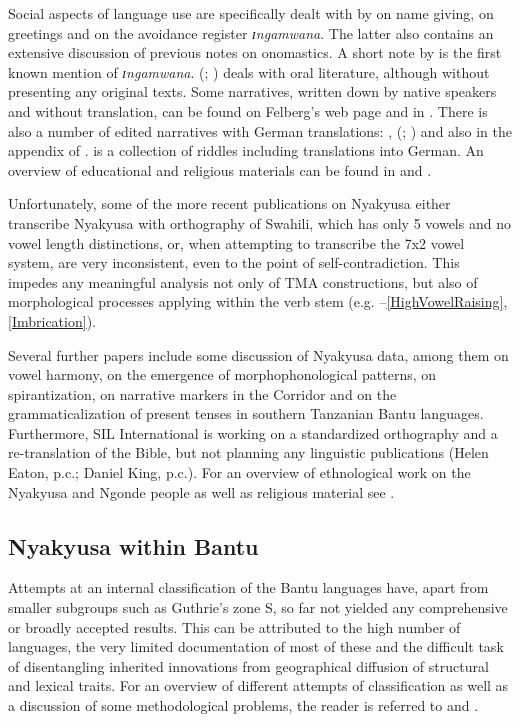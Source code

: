 Social aspects of language use are specifically dealt with by \citet{HodsonT1934} on name giving, \citet{WalshM1982} on greetings and \citet{KolbusaS2000} on the avoidance register \textit{ɪngamwana}. The latter also contains an extensive discussion of previous notes on onomastics. A short note by \citet{Cleve1904} is the first known mention of \textit{ɪngamwana}.
\citeauthor{MwakasakaC1975} (\citeyear{MwakasakaC1975}; \citeyear{MwakasakaC1978}) deals with oral literature, although without presenting any original texts. Some narratives, written down by native speakers and without translation, can be found on Felberg's web page \citep{FelbergK2010} and in \citet{MwangokaNVoorhoeveJ1960a}. There is also a number of edited narratives with German translations: \citet{BergerP1933}, \citeauthor{BusseJ1942} (\citeyear{BusseJ1942}; \citeyear{BusseJ1949}) and also in the appendix of \citet{SchumannK1899}. \citet{BusseJ1957} is a collection of riddles including translations into German. An overview of educational and religious materials can be found in \citet{KroegerR2011} and \citet{FelbergK2010}.

Unfortunately, some of the more recent publications on Nyakyusa either transcribe Nyakyusa with orthography of Swahili, which has only 5 vowels and no vowel length distinctions, or, when attempting to transcribe the 7x2 vowel system, are very inconsistent, even to the point of self-contradiction. This impedes any meaningful analysis not only of TMA constructions, but also of morphological processes applying within the verb stem (e.g. --\ref{HighVowelRaising}, \ref{Imbrication}).

Several further papers include some discussion of Nyakyusa data, among them \citet{HymanL1999} on vowel harmony, \citet{HymanL2003b} on the emergence of morphophonological patterns, \citet{BoestonK2008} on spirantization, \citet{EatonH2013} on narrative markers in the Corridor and \citet{PersohnBBernanderR2016} on the grammaticalization of present tenses in southern Tanzanian Bantu languages. Furthermore, SIL International is working on a standardized orthography and a re-translation of the Bible, but not planning any linguistic publications (Helen Eaton, p.c.; Daniel King, p.c.). For an overview of ethnological work on the Nyakyusa and Ngonde people as well as religious material see \citet{MwalilinoW1995}.
\subsection{Nyakyusa within Bantu}\label{LinguisticClassification}
Attempts at an internal classification of the Bantu languages have, apart from smaller subgroups such as Guthrie's zone S, so far not yielded any comprehensive or broadly accepted results. This can be attributed to the high number of languages, the very limited documentation of most of these and the difficult task of disentangling inherited innovations from geographical diffusion of structural and lexical traits. For an overview of different attempts of classification as well as a discussion of some methodological problems, the reader is referred to \citet[102–114]{MoehligW1981} and \citet{NurseDPhillipsonG2003b}.

